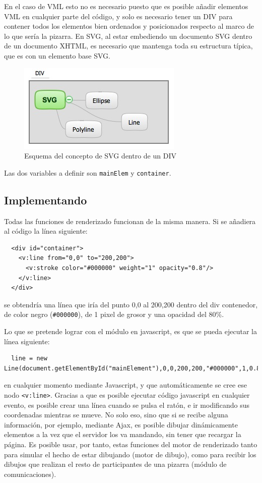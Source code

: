En el caso de VML esto no es necesario puesto que es posible añadir elementos VML en cualquier parte del código, y solo es necesario tener un DIV para contener todos los elementos bien ordenados y posicionados respecto al marco de lo que sería la pizarra. En SVG, al estar embediendo un documento SVG dentro de un documento XHTML, es necesario que mantenga toda su estructura típica, que es con un elemento base SVG.

\begin{figure}[h!]
\centering
\includegraphics{divsvg.png}
\caption{Esquema del concepto de SVG dentro de un DIV}\label{fig:divsvg}
\end{figure}

Las dos variables a definir son \texttt{mainElem} y \texttt{container}.

\subsection{Implementando}
Todas las funciones de renderizado funcionan de la misma manera. Si se añadiera al código la línea siguiente:
\begin{verbatim}
  <div id="container">
    <v:line from="0,0" to="200,200">
      <v:stroke color="#000000" weight="1" opacity="0.8"/>
    </v:line>
  </div>
\end{verbatim}
se obtendría una línea que iría del punto 0,0 al 200,200 dentro del div contenedor, de color negro (\texttt{\#000000}), de 1 pixel de grosor y una opacidad del 80\%.

Lo que se pretende lograr con el módulo en javascript, es que se pueda ejecutar la línea siguiente:
\begin{verbatim}
  line = new Line(document.getElementById("mainElement"),0,0,200,200,"#000000",1,0.8);
\end{verbatim}
en cualquier momento mediante Javascript, y que automáticamente se cree ese nodo \texttt{<v:line>}. Gracias a que es posible ejecutar código javascript en cualquier evento, es posible crear una línea cuando se pulsa el ratón, e ir modificando sus coordenadas mientras se mueve. No solo eso, sino que si se recibe alguna información, por ejemplo, mediante Ajax, es posible dibujar dinámicamente elementos a la vez que el servidor los va mandando, sin tener que recargar la página. Es posible usar, por tanto, estas funciones del motor de renderizado tanto para simular el hecho de estar dibujando (motor de dibujo), como para recibir los dibujos que realizan el resto de participantes de una pizarra (módulo de comunicaciones).

